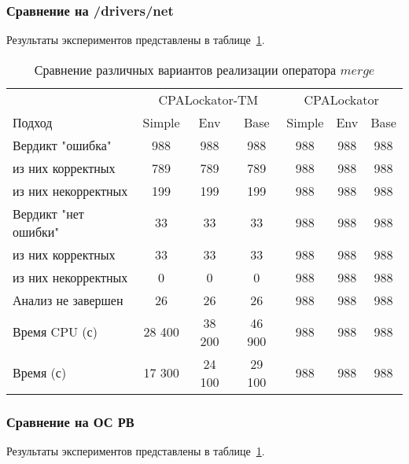 \subsubsection{Сравнение на /drivers/net}
Результаты экспериментов представлены в таблице~\ref{table-drivers-lock-merge}.

\begin{center}
  \begin{table}[h]\footnotesize
  	\label{table-drivers-lock-merge}
    \caption{Сравнение различных вариантов реализации оператора $merge$}
    \begin{tabular}{ | l | c | c | c | c | c | c |}
      \hline
      					& \multicolumn{3}{|c|}{CPALockator-TM} 	& \multicolumn{3}{|c|}{CPALockator} 	\\
      Подход         				& Simple 	& Env 	& Base 	& Simple 	& Env 	& Base  	\\ \hline
      Вердикт "ошибка" 				& 988    	& 988   & 988   & 988       & 988   & 988  	 	\\ 
  \hspace{0.5cm} из них корректных 	& 789 		& 789 	& 789   & 988       & 988   & 988   	\\ 
  \hspace{0.5cm} из них некорректных & 199 		& 199 	& 199   & 988       & 988   & 988     	\\ \hline
      Вердикт "нет ошибки"  		& 33      	& 33    & 33    & 988       & 988  	& 988     	\\ 
  \hspace{0.5cm} из них корректных 	& 33 		& 33    & 33    & 988       & 988   & 988   	\\
  \hspace{0.5cm} из них некорректных & 0 		& 0    	& 0     & 988       & 988   & 988   	\\ \hline
      Анализ не завершен       		& 26     	& 26    & 26    & 988       & 988   & 988   	\\ \hline
      Время CPU (с)   				& 28 400 	& 38 200 & 46 900 & 988     & 988   & 988   	\\ 
      Время (с)  					& 17 300 	& 24 100 & 29 100 & 988     & 988 	& 988    	\\
      \hline
    \end{tabular}
  \end{table}
\end{center}

\subsubsection{Сравнение на ОС РВ}
Результаты экспериментов представлены в таблице~\ref{table-drivers-lock-merge}.

